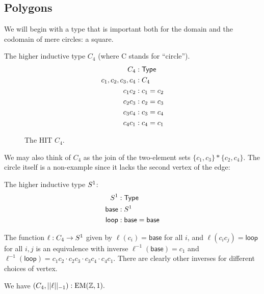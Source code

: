 \subsection{Polygons}

We will begin with a type that is important both for the domain and the codomain of mere circles: a square.

\begin{mydef}
The higher inductive type \( C_4 \) (where C stands for ``circle'').
\begin{align*}
C_4 &: \mathsf{Type} \\
c_1, c_2, c_3, c_4 &: C_4 \\
c_1c_2 &: c_1 = c_2 \\
c_2c_3 &: c_2 = c_3 \\
c_3c_4 &: c_3 = c_4 \\
c_4c_1 &: c_4 = c_1 \\
\end{align*}
\end{mydef}

\begin{figure}[htbp]
\centering

\caption{The HIT \( C_4 \).}
\end{figure}

We may also think of \( C_4 \) as the join of the two-element sets \( \{c_1, c_3\}* \{c_2, c_4\} \). The circle itself is a non-example since it lacks the second vertex of the edge:

\begin{mydef}
The higher inductive type \( S^1 \):
\begin{align*}
S^1 &:\mathsf{Type} \\
\mathsf{base}&:S^1 \\
\mathsf{loop}&:\mathsf{base}=\mathsf{base}
\end{align*}
\end{mydef}

\begin{mylemma}
The function \( \ell:C_4\to S^1 \) given by \( \ell(c_i)=\mathsf{base} \) for all \( i \), and \( \ell(c_ic_j)=\mathsf{loop} \) for all \( i,j \) is an equivalence with inverse \( \ell^{-1}(\mathsf{base})=c_1 \) and \( \ell^{-1}(\mathsf{loop})=c_1c_2\cdot c_2c_3\cdot c_3c_4\cdot c_4c_1 \). There are clearly other inverses for different choices of vertex.
\end{mylemma}

\begin{mycor}
We have \( (C_4,||\ell||_{-1}):\mathrm{EM}(\mathbb{Z},1). \)
\end{mycor}

